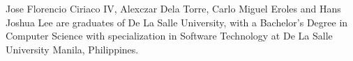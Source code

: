 \documentclass{sigchi-ext}
\begin{document}
Jose Florencio Ciriaco IV, Alexczar Dela Torre, Carlo Miguel Eroles and Hans Joshua Lee are graduates of De La Salle University, with a Bachelor's Degree in Computer Science with specialization in Software Technology at De La Salle University Manila, Philippines.






\end{document}
